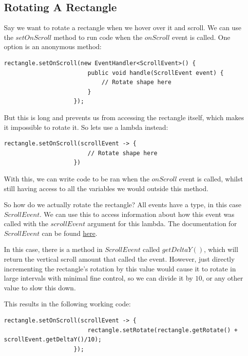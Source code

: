 \documentclass[a4paper]{report}
\newcommand{\link}[2]{\color{blue}\href{#1}{#2}\color{black}}
\begin{document}
			\subsection{Rotating A Rectangle}\label{subsec:rotating a rectangle}
			
				Say we want to rotate a rectangle when we hover over it and scroll. We can use the $setOnScroll$ method to run code when the $onScroll$ event is called. One option is an anonymous method:
				
				\begin{lstlisting}[gobble=20]
					rectangle.setOnScroll(new EventHandler<ScrollEvent>() {
						public void handle(ScrollEvent event) {
							// Rotate shape here
						}
					});
				\end{lstlisting}
				
				But this is long and prevents us from accessing the rectangle itself, which makes it impossible to rotate it. So lets use a lambda instead:
				
				\begin{lstlisting}[gobble=20]
					rectangle.setOnScroll(scrollEvent -> {
						// Rotate shape here
					})
				\end{lstlisting}
				
				With this, we can write code to be ran when the $onScroll$ event is called, whilst still having access to all the variables we would outside this method.
				
				So how do we actually rotate the rectangle? All events have a type, in this case $ScrollEvent$. We can use this to access information about how this event was called with the $scrollEvent$ argument for this lambda. The documentation for $ScrollEvent$ can be found \link{https://docs.oracle.com/javase/8/javafx/api/javafx/scene/input/ScrollEvent.html}{here}.
				
				In this case, there is a method in $ScrollEvent$ called $getDeltaY()$, which will return the vertical scroll amount that called the event. However, just directly incrementing the rectangle's rotation by this value would cause it to rotate in large intervals with minimal fine control, so we can divide it by $10$, or any other value to slow this down.
				
				This results in the following working code:
				
				\begin{lstlisting}[gobble=20]
					rectangle.setOnScroll(scrollEvent -> {
						rectangle.setRotate(rectangle.getRotate() + scrollEvent.getDeltaY()/10);
					});
				\end{lstlisting}
			
\end{document}
